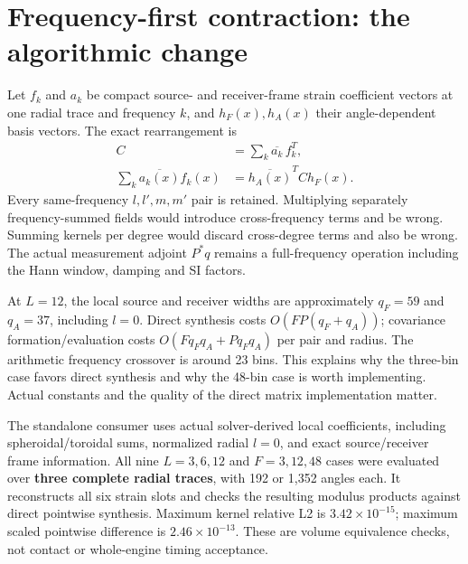 \section{Frequency-first contraction: the algorithmic change}
Let $f_k$ and $a_k$ be compact source- and receiver-frame strain coefficient vectors at one radial trace and frequency $k$, and $h_F(x),h_A(x)$ their angle-dependent basis vectors. The exact rearrangement is
\begin{align*}
 C&=\sum_k\overline{a_k}\,f_k^T,\\
 \sum_k\overline{a_k(x)}f_k(x)
 &=\overline{h_A(x)}^T C h_F(x).
\end{align*}
Every same-frequency $l,l',m,m'$ pair is retained. Multiplying separately frequency-summed fields would introduce cross-frequency terms and be wrong. Summing kernels per degree would discard cross-degree terms and also be wrong. The actual measurement adjoint $P^*q$ remains a full-frequency operation including the Hann window, damping and SI factors.

At $L=12$, the local source and receiver widths are approximately $q_F=59$ and $q_A=37$, including $l=0$. Direct synthesis costs $O(FP(q_F+q_A))$; covariance formation/evaluation costs $O(Fq_Fq_A+Pq_Fq_A)$ per pair and radius. The arithmetic frequency crossover is around 23 bins. This explains why the three-bin case favors direct synthesis and why the 48-bin case is worth implementing. Actual constants and the quality of the direct matrix implementation matter.

The standalone consumer uses actual solver-derived local coefficients, including spheroidal/toroidal sums, normalized radial $l=0$, and exact source/receiver frame information. All nine $L=3,6,12$ and $F=3,12,48$ cases were evaluated over \textbf{three complete radial traces}, with 192 or 1,352 angles each. It reconstructs all six strain slots and checks the resulting modulus products against direct pointwise synthesis. Maximum kernel relative L2 is $3.42\times10^{-15}$; maximum scaled pointwise difference is $2.46\times10^{-13}$. These are volume equivalence checks, not contact or whole-engine timing acceptance.

